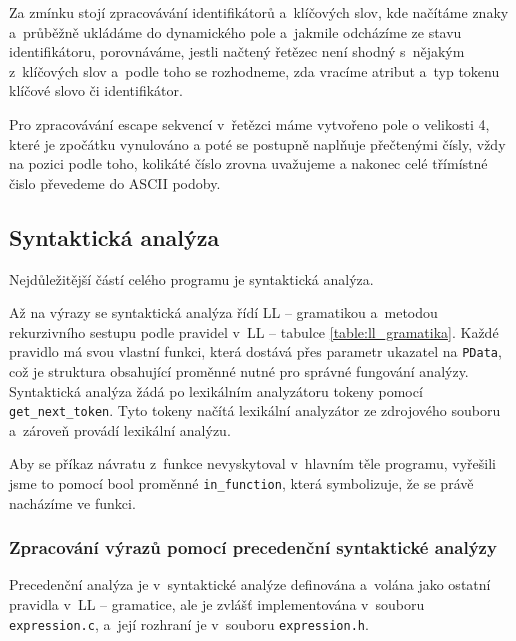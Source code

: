 \documentclass[a4paper, 11pt]{article}
\begin{document}
	Za zmínku stojí zpracovávání identifikátorů a~klíčových slov, kde načítáme znaky a~průběžně ukládáme do dynamického pole
	a~jakmile odcházíme ze stavu identifikátoru, porovnáváme, jestli načtený řetězec není shodný s~nějakým z~klíčových slov a~podle
	toho se rozhodneme, zda vracíme atribut a~typ tokenu klíčové slovo či identifikátor.

	Pro zpracovávání escape sekvencí v~řetězci máme vytvořeno pole o velikosti 4, které je zpočátku vynulováno a poté se postupně
	naplňuje přečtenými čísly, vždy na pozici podle toho, kolikáté číslo zrovna uvažujeme a nakonec celé třímístné čislo převedeme
	do ASCII podoby.


	\subsection{Syntaktická analýza}

	Nejdůležitější částí celého programu je syntaktická analýza.

	Až na výrazy se syntaktická analýza řídí LL -- gramatikou a~metodou rekurzivního sestupu podle pravidel v~LL -- tabulce
	\ref{table:ll_gramatika}. Každé pravidlo má svou vlastní funkci, která dostává přes parametr ukazatel na \texttt{PData},
	což je struktura obsahující proměnné nutné pro správné fungování analýzy. Syntaktická analýza žádá po lexikálním
	analyzátoru tokeny pomocí \texttt{get\_next\_token}. Tyto tokeny načítá lexikální analyzátor ze zdrojového souboru
	a~zároveň provádí lexikální analýzu.

	Aby se příkaz návratu z~funkce nevyskytoval v~hlavním těle programu, vyřešili jsme to pomocí bool proměnné \texttt{in\_function},
	která symbolizuje, že se právě nacházíme ve funkci.

	\subsubsection{Zpracování výrazů pomocí precedenční syntaktické analýzy}

	Precedenční analýza je v~syntaktické analýze definována a~volána jako ostatní pravidla v~LL -- gramatice,
	ale je zvlášť implementována v~souboru \texttt{expression.c}, a~její rozhraní je v~souboru \texttt{expression.h}.
\end{document}
